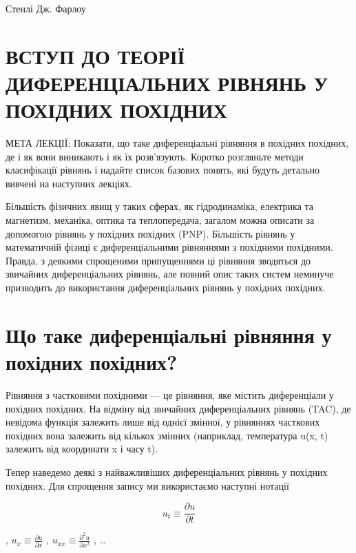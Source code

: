 \documentclass[
  ukrainian,
]{article}
\begin{document}
Стенлі Дж. Фарлоу

\section{ВСТУП ДО ТЕОРІЇ ДИФЕРЕНЦІАЛЬНИХ РІВНЯНЬ У ПОХІДНИХ
ПОХІДНИХ}\label{ux432ux441ux442ux443ux43f-ux434ux43e-ux442ux435ux43eux440ux456ux457-ux434ux438ux444ux435ux440ux435ux43dux446ux456ux430ux43bux44cux43dux438ux445-ux440ux456ux432ux43dux44fux43dux44c-ux443-ux43fux43eux445ux456ux434ux43dux438ux445-ux43fux43eux445ux456ux434ux43dux438ux445}

МЕТА ЛЕКЦІЇ: Показати, що таке диференціальні рівняння в похідних
похідних, де і як вони виникають і як їх розв'язують. Коротко розгляньте
методи класифікації рівнянь і надайте список базових понять, які будуть
детально вивчені на наступних лекціях.

Більшість фізичних явищ у таких сферах, як гідродинаміка, електрика та
магнетизм, механіка, оптика та теплопередача, загалом можна описати за
допомогою рівнянь у похідних похідних (PNP). Більшість рівнянь у
математичній фізиці є диференціальними рівняннями з похідними похідними.
Правда, з деякими спрощеними припущеннями ці рівняння зводяться до
звичайних диференціальних рівнянь, але повний опис таких систем неминуче
призводить до використання диференціальних рівнянь у похідних похідних.

\section{Що таке диференціальні рівняння у похідних
похідних?}\label{ux449ux43e-ux442ux430ux43aux435-ux434ux438ux444ux435ux440ux435ux43dux446ux456ux430ux43bux44cux43dux456-ux440ux456ux432ux43dux44fux43dux43dux44f-ux443-ux43fux43eux445ux456ux434ux43dux438ux445-ux43fux43eux445ux456ux434ux43dux438ux445}

Рівняння з частковими похідними --- це рівняння, яке містить
диференціали у похідних похідних. На відміну від звичайних
диференціальних рівнянь (TAC), де невідома функція залежить лише від
однієї змінної, у рівняннях часткових похідних вона залежить від кількох
змінних (наприклад, температура u(x, t) залежить від координати x і часу
t).

Тепер наведемо деякі з найважливіших диференціальних рівнянь у похідних
похідних. Для спрощення запису ми використаємо наступні нотації

\[
u_t \equiv \frac{\partial u}{\partial t}
\]

, \(u_x \equiv \frac{\partial u}{\partial x}\) ,
\(u_{xx} \equiv \frac{\partial^2 u}{\partial x^2}\) , \ldots{}
\end{document}
